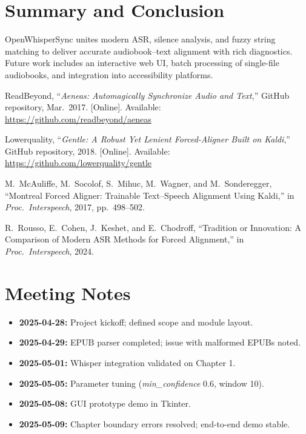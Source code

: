 \documentclass[12pt]{article}
\begin{document}
\section{Summary and Conclusion}
OpenWhisperSync unites modern ASR, silence analysis, and fuzzy
string matching to deliver accurate audiobook–text alignment with rich
diagnostics.
Future work includes an interactive web UI, batch processing of
single-file audiobooks, and integration into accessibility platforms.

\begin{thebibliography}{9}
ReadBeyond, “\emph{Aeneas: Automagically Synchronize Audio and Text},”
GitHub repository, Mar.\ 2017. [Online]. Available:
\url{https://github.com/readbeyond/aeneas}

Lowerquality, “\emph{Gentle: A Robust Yet Lenient Forced-Aligner Built on Kaldi},”
GitHub repository, 2018. [Online]. Available:
\url{https://github.com/lowerquality/gentle}

M.~McAuliffe, M.~Socolof, S.~Mihuc, M.~Wagner, and M.~Sonderegger,
“Montreal Forced Aligner: Trainable Text–Speech Alignment Using Kaldi,”
in \emph{Proc.\ Interspeech}, 2017, pp.\ 498–502.

R.~Rousso, E.~Cohen, J.~Keshet, and E.~Chodroff,
“Tradition or Innovation: A Comparison of Modern ASR Methods for Forced Alignment,”
in \emph{Proc.\ Interspeech}, 2024.

\end{thebibliography}

\section*{Meeting Notes}
\begin{itemize}
  \item \textbf{2025-04-28:} Project kickoff; defined scope and module layout.
  \item \textbf{2025-04-29:} EPUB parser completed; issue with malformed EPUBs noted.
  \item \textbf{2025-05-01:} Whisper integration validated on Chapter 1.
  \item \textbf{2025-05-05:} Parameter tuning (\textit{min\_confidence} 0.6, window 10).
  \item \textbf{2025-05-08:} GUI prototype demo in Tkinter.
  \item \textbf{2025-05-09:} Chapter boundary errors resolved; end-to-end demo stable.
\end{itemize}
\end{document}
